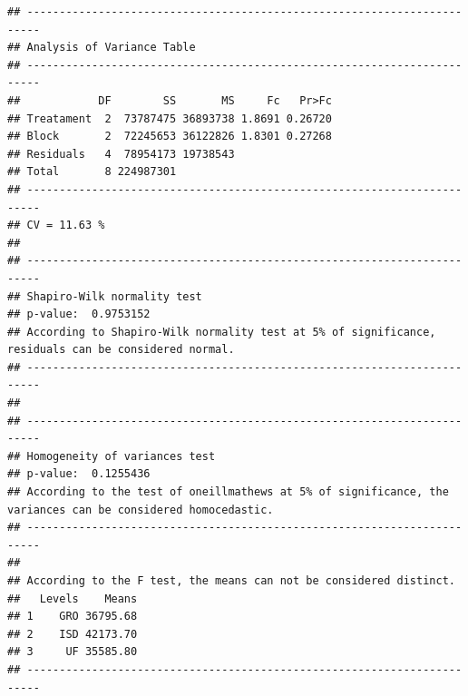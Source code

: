 \documentclass[
]{article}
\begin{document}
\begin{verbatim}
## ------------------------------------------------------------------------
## Analysis of Variance Table
## ------------------------------------------------------------------------
##            DF        SS       MS     Fc   Pr>Fc
## Treatament  2  73787475 36893738 1.8691 0.26720
## Block       2  72245653 36122826 1.8301 0.27268
## Residuals   4  78954173 19738543               
## Total       8 224987301                        
## ------------------------------------------------------------------------
## CV = 11.63 %
## 
## ------------------------------------------------------------------------
## Shapiro-Wilk normality test
## p-value:  0.9753152 
## According to Shapiro-Wilk normality test at 5% of significance, residuals can be considered normal.
## ------------------------------------------------------------------------
## 
## ------------------------------------------------------------------------
## Homogeneity of variances test
## p-value:  0.1255436 
## According to the test of oneillmathews at 5% of significance, the variances can be considered homocedastic.
## ------------------------------------------------------------------------
## 
## According to the F test, the means can not be considered distinct.
##   Levels    Means
## 1    GRO 36795.68
## 2    ISD 42173.70
## 3     UF 35585.80
## ------------------------------------------------------------------------
\end{verbatim}
\end{document}
